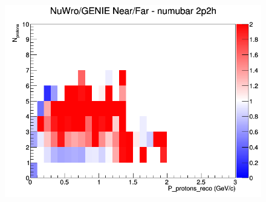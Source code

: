 \begin{figure}[h]
\endminipage
{}
\includegraphics[width=\linewidth]{eff_N_P/GAr/protons/ratios/2p2h_NuWro_GENIE_numubar_NF_N_P.png}
\endminipage
\newline
\end{figure}
\clearpage
